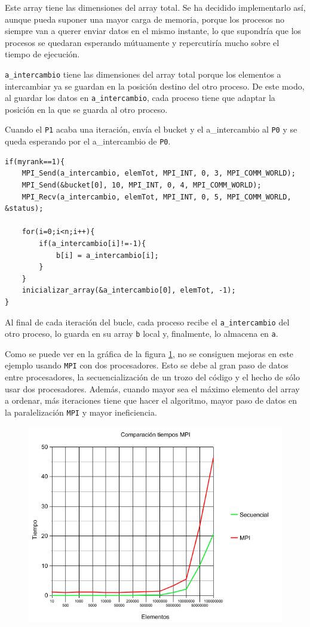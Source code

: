 Este array tiene las dimensiones del array total. Se ha decidido implementarlo así, aunque pueda suponer una mayor carga de memoria, porque los procesos no siempre van a querer enviar datos en el mismo instante, lo que supondría que los procesos se quedaran esperando mútuamente y repercutiría mucho sobre el tiempo de ejecución.

\texttt{a\_intercambio} tiene las dimensiones del array total porque los elementos a intercambiar ya se guardan en la posición destino del otro proceso. De este modo, al guardar los datos en \texttt{a\_intercambio}, cada proceso tiene que adaptar la posición en la que se guarda al otro proceso.


Cuando el \texttt{P1} acaba una iteración, envía el bucket y el a\_intercambio al \texttt{P0} y se queda esperando por el a\_intercambio de \texttt{P0}.
\begin{lstlisting}[frame=single]
if(myrank==1){
	MPI_Send(a_intercambio, elemTot, MPI_INT, 0, 3, MPI_COMM_WORLD);
	MPI_Send(&bucket[0], 10, MPI_INT, 0, 4, MPI_COMM_WORLD);
	MPI_Recv(a_intercambio, elemTot, MPI_INT, 0, 5, MPI_COMM_WORLD, &status);

	for(i=0;i<n;i++){
		if(a_intercambio[i]!=-1){
			b[i] = a_intercambio[i];
		}
	}
	inicializar_array(&a_intercambio[0], elemTot, -1);
}
\end{lstlisting}

Al final de cada iteración del bucle, cada proceso recibe el \texttt{a\_intercambio} del otro proceso, lo guarda en su array \texttt{b} local y, finalmente, lo almacena en \texttt{a}.


Como se puede ver en la gráfica de la figura \ref{grafica_mpi}, no se consiguen mejoras en este ejemplo usando \texttt{MPI} con dos procesadores. Esto se debe al gran paso de datos entre procesadores, la secuencialización de un trozo del código y el hecho de sólo usar dos procesadores. Además, cuando mayor sea el máximo elemento del array a ordenar, más iteraciones tiene que hacer el algoritmo, mayor paso de datos en la paralelización \texttt{MPI} y mayor ineficiencia.

\begin{figure}[h!]
	\centering
	
	\includegraphics[width=1\textwidth]{./res/grafica_mpi}
	\label{grafica_mpi}
\end{figure}